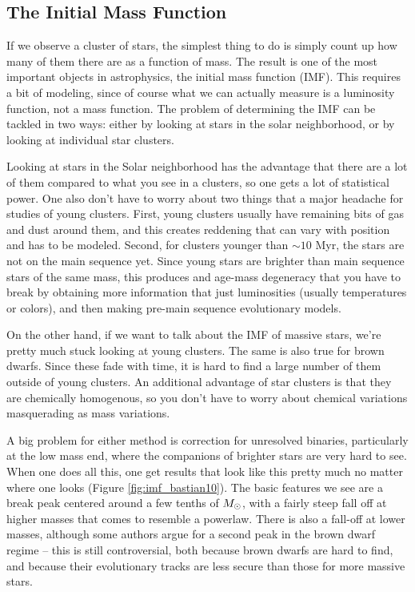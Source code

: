 \subsection{The Initial Mass Function}

If we observe a cluster of stars, the simplest thing to do is simply count up how many of them there are as a function of mass. The result is one of the most important objects in astrophysics, the initial mass function (IMF). This requires a bit of modeling, since of course what we can actually measure is a luminosity function, not a mass function. The problem of determining the IMF can be tackled in two ways: either by looking at stars in the solar neighborhood, or by looking at individual star clusters.

Looking at stars in the Solar neighborhood has the advantage that there are a lot of them compared to what you see in a clusters, so one gets a lot of statistical power. One also don't have to worry about two things that a major headache for studies of young clusters. First, young clusters usually have remaining bits of gas and dust around them, and this creates reddening that can vary with position and has to be modeled. Second, for clusters younger than $\sim 10$ Myr, the stars are not on the main sequence yet. Since young stars are brighter than main sequence stars of the same mass, this produces and age-mass degeneracy that you have to break by obtaining more information that just luminosities (usually temperatures or colors), and then making pre-main sequence evolutionary models. 

On the other hand, if we want to talk about the IMF of massive stars, we're pretty much stuck looking at young clusters. The same is also true for brown dwarfs. Since these fade with time, it is hard to find a large number of them outside of young clusters. An additional advantage of star clusters is that they are chemically homogenous, so you don't have to worry about chemical variations masquerading as mass variations.

A big problem for either method is correction for unresolved binaries, particularly at the low mass end, where the companions of brighter stars are very hard to see. When one does all this, one get results that look like this pretty much no matter where one looks (Figure \ref{fig:imf_bastian10}).  The basic features we see are a break peak centered around a few tenths of $M_{\odot}$, with a fairly steep fall off at higher masses that comes to resemble a powerlaw. There is also a fall-off at lower masses, although some authors argue for a second peak in the brown dwarf regime -- this is still controversial, both because brown dwarfs are hard to find, and because their evolutionary tracks are less secure than those for more massive stars.

